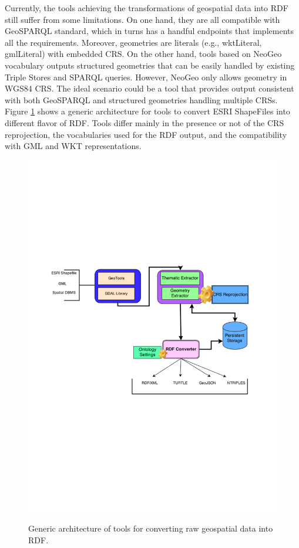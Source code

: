 Currently, the tools achieving the transformations of geospatial data into RDF still suffer from some limitations. On one hand, they are all compatible with GeoSPARQL standard, which in turns has a handful endpoints that implements all the requirements. Moreover, geometries are literals (e.g., wktLiteral, gmlLiteral) with embedded CRS. On the other hand, tools based on NeoGeo vocabulary outputs structured geometries that can be easily handled by existing Triple Stores and SPARQL queries. However, NeoGeo only allows geometry in WGS84 CRS. The ideal scenario could be a tool that provides output consistent with both GeoSPARQL and structured geometries handling multiple CRSs. 
Figure \ref{fig:shape2rdf-generic} shows a generic architecture for tools to convert ESRI ShapeFiles into different flavor of RDF. Tools differ mainly in the presence or not of the CRS reprojection, the vocabularies used for the RDF output, and the compatibility with GML and WKT representations.   

\begin{figure}[ht!b]
\includegraphics[scale=0.7]{img/shape2rdf-generic.pdf}
\label{fig:shape2rdf-generic}
\caption{Generic architecture of tools for converting raw geospatial data into RDF.}
\end{figure}

